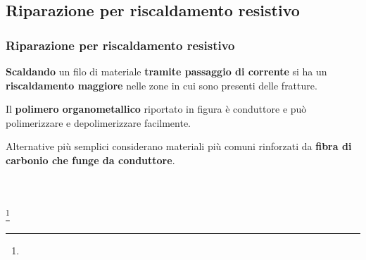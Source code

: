 \subsection{Riparazione per riscaldamento resistivo}
\begin{frame}\frametitle{Riparazione per riscaldamento resistivo}
\textbf{Scaldando} un filo di materiale \textbf{tramite passaggio di corrente} si ha un \textbf{riscaldamento maggiore} nelle zone in cui sono presenti delle fratture.

Il \textbf{polimero organometallico} riportato in figura è conduttore e può polimerizzare e depolimerizzare facilmente.

Alternative più semplici considerano materiali più comuni rinforzati da \textbf{fibra di carbonio che funge da conduttore}.
\begin{columns}
\begin{figure}{}\end{figure}
\begin{figure}{}\end{figure}
\end{columns}
\footnote{\tiny  {}}

\end{frame}





